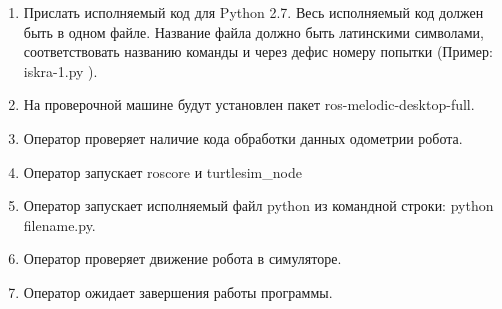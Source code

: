 \begin{enumerate}
    \item Прислать исполняемый код для Python 2.7. Весь исполняемый код должен быть в одном файле. Название файла должно быть латинскими символами, соответствовать названию команды и через дефис номеру попытки (Пример:  iskra-1.py ).
    \item На проверочной машине будут установлен пакет ros-melodic-desktop-full.
    \item Оператор проверяет наличие кода обработки данных одометрии робота.
    \item Оператор запускает roscore и turtlesim\_node
    \item Оператор запускает исполняемый файл python из командной строки: python filename.py.
    \item Оператор проверяет движение робота в симуляторе.
    \item Оператор ожидает завершения работы программы.
\end{enumerate}